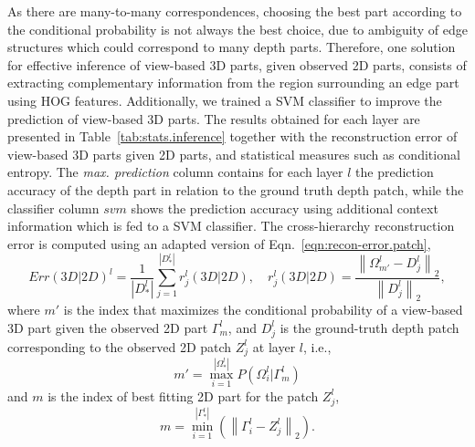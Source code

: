 \documentclass[runningheads]{llncs}
\begin{document}
As there are many-to-many correspondences, choosing the best part according to the conditional probability is not always the best choice, due to ambiguity of edge structures which could correspond to many depth parts. Therefore, one solution for effective inference of view-based 3D parts, given observed 2D parts, consists of extracting complementary information from the region surrounding an edge part using HOG features. Additionally, we trained a SVM classifier to improve the prediction of view-based 3D parts. The results obtained for each layer are presented in Table~\ref{tab:stats.inference} together with the reconstruction error of view-based 3D parts given 2D parts, and statistical measures such as conditional entropy. The \textit{max. prediction} column contains for each layer $l$ the prediction accuracy of the depth part in relation to the ground truth depth patch, while the classifier column $svm$ shows the prediction accuracy using additional context information which is fed to a SVM classifier. The cross-hierarchy reconstruction error is computed using an adapted version of Eqn.~\ref{eqn:recon-error.patch},
\begin{equation}
 Err(3D|2D)^l = \frac{1}{|D_*^l|} \sum_{j=1}^{|D_*^l|} r_j^l(3D|2D),\quad
 r_j^l(3D|2D) = \frac{\left\|\Omega_{m'}^l-D_j^l\right\|_2}{\left\|D_j^l\right\|_2}, 
\end{equation}
 where $m'$ is the index that maximizes the conditional probability of a view-based 3D part given the observed 2D part $\Gamma_m^l$, and $D_j^l$ is the ground-truth depth patch corresponding to the observed 2D patch $Z_j^l$ at layer $l$, i.e.,
\begin{equation}
 m'=\max_{i=1}^{|\Omega_*^l|}P(\Omega_i^l|\Gamma_m^l)
\end{equation}
and $m$ is the index of best fitting 2D part for the patch $Z_j^l$,
\begin{equation}
 m=\min_{i=1}^{|\Gamma_*^l|}(\left\|\Gamma_i^l-Z_j^l\right\|_2).
\end{equation}
\end{document}
